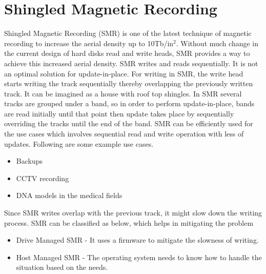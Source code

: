 \section{Shingled Magnetic Recording}

Shingled Magnetic Recording (SMR) is one of the latest technique of magnetic recording to increase the aerial density up to 10Tb/in$^2$. Without much change in the current design of hard disks read and write heads, SMR provides a way to achieve this increased aerial density. SMR writes and reads sequentially. It is not an optimal solution for update-in-place. For writing in SMR, the write head starts writing the track sequentially thereby overlapping the previously written track. It can be imagined as a house with roof top shingles. In SMR several tracks are grouped under a band, so in order to  perform update-in-place, bands are read initially until that point then update takes place by sequentially overriding the tracks until the end of the band. SMR can be efficiently used for the use cases which involves sequential read and write operation with less of updates. Following are some example use cases.
\begin{itemize}
\item Backups
\item CCTV recording
\item DNA models in the medical fields
\end{itemize}

Since SMR writes overlap with the previous track, it might slow down the writing process. SMR can be classified as below, which helps in mitigating the problem
\begin{itemize}
\item Drive Managed SMR - It uses a firmware to mitigate the slowness of writing.
\item Host Managed SMR - The operating system needs to know how to handle the situation based on the needs.
\end{itemize}
